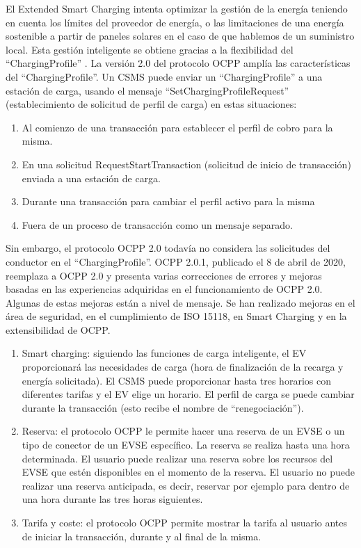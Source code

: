 \documentclass[12pt,a4paper,onecolumn,oneside]{report}
\begin{document}
El Extended Smart Charging intenta optimizar la gestión de la energía teniendo en cuenta los límites del proveedor de energía, o las limitaciones de una energía sostenible a partir de paneles solares en el caso de que hablemos de un suministro local. Esta gestión inteligente se obtiene gracias a la flexibilidad del ``ChargingProfile” . La versión 2.0 del protocolo OCPP amplía las características del ``ChargingProfile”. Un CSMS puede enviar un ``ChargingProfile” a una estación de carga, usando el mensaje ``SetChargingProfileRequest” (establecimiento de solicitud de perfil de carga) en estas situaciones:

\begin{enumerate}

\item Al comienzo de una transacción para establecer el perfil de cobro para la misma.
\item En una solicitud RequestStartTransaction (solicitud de inicio de transacción) enviada a una estación de carga.
\item Durante una transacción para cambiar el perfil activo para la misma
\item Fuera de un proceso de transacción como un mensaje separado.

\end{enumerate}

Sin embargo, el protocolo OCPP 2.0 todavía no considera las solicitudes del conductor en el ``ChargingProfile”. OCPP 2.0.1, publicado el 8 de abril de 2020, reemplaza a OCPP 2.0 y presenta varias correcciones de errores y mejoras basadas en las experiencias adquiridas en el funcionamiento de OCPP 2.0. Algunas de estas mejoras están a nivel de mensaje. Se han realizado mejoras en el área de seguridad, en el cumplimiento de ISO 15118, en Smart Charging y en la extensibilidad de OCPP.

\begin{enumerate}

\item Smart charging: siguiendo las funciones de carga inteligente, el EV proporcionará las necesidades de carga (hora de finalización de la recarga y energía solicitada). El CSMS puede proporcionar hasta tres horarios con diferentes tarifas y el EV elige un horario. El perfil de carga se puede cambiar durante la transacción (esto recibe el nombre de ``renegociación”).
\item Reserva: el protocolo OCPP le permite hacer una reserva de un EVSE o un tipo de conector de un EVSE específico. La reserva se realiza hasta una hora determinada. El usuario puede realizar una reserva sobre los recursos del EVSE que estén disponibles en el momento de la reserva. El usuario no puede realizar una reserva anticipada, es decir, reservar por ejemplo para dentro de una hora durante las tres horas siguientes.
\item Tarifa y coste: el protocolo OCPP permite mostrar la tarifa al usuario antes de iniciar la transacción, durante y al final de la misma.

\end{enumerate}
\end{document}

